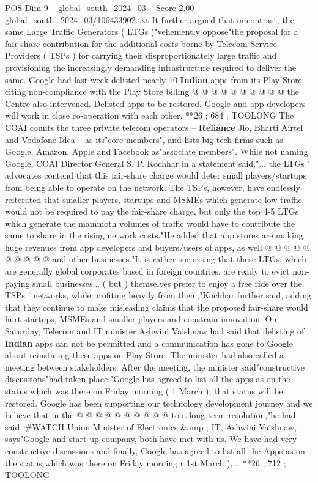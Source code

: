 \begin{textsample}{POS Dim 9 – global\_south\_2024\_03 – Score 2.00 – global\_south\_2024\_03/106433902.txt}
It further argued that in contrast, the same Large Traffic Generators ( LTGs )"vehemently oppose"the proposal for a fair-share contribution for the additional costs borne by Telecom Service Providers ( TSPs ) for carrying their disproportionately large traffic and provisioning the increasingly demanding infrastructure required to deliver the same.
Google had last week delisted nearly 10 \textbf{Indian} apps from its Play Store citing non-compliance with the Play Store billing @ @ @ @ @ @ @ @ @ @ the Centre also intervened.
Delisted apps to be restored.
Google and app developers will work in close co-operation with each other. **26 ; 684 ; TOOLONG The COAI counts the three private telecom operators -- \textbf{Reliance} Jio, Bharti Airtel and Vodafone Idea -- as its"core members", and lists big tech firms such as Google, Amazon, Apple and Facebook as"associate members".
While not naming Google, COAI Director General S.
P.
Kochhar in a statement said,"... the LTGs ' advocates contend that this fair-share charge would deter small players/startups from being able to operate on the network.
The TSPs, however, have endlessly reiterated that smaller players, startups and MSMEs which generate low traffic would not be required to pay the fair-share charge, but only the top 4-5 LTGs which generate the mammoth volumes of traffic would have to contribute the same to share in the rising network costs."He added that app stores are making huge revenues from app developers and buyers/users of apps, as well @ @ @ @ @ @ @ @ @ @ and other businesses."It is rather surprising that these LTGs, which are generally global corporates based in foreign countries, are ready to evict non-paying small businesses... ( but ) themselves prefer to enjoy a free ride over the TSPs ' networks, while profiting heavily from them,"Kochhar further said, adding that they continue to make misleading claims that the proposed fair-share would hurt startups, MSMEs and smaller players and constrain innovation.
On Saturday, Telecom and IT minister Ashwini Vaishnaw had said that delisting of \textbf{Indian} apps can not be permitted and a communication has gone to Google about reinstating these apps on Play Store.
The minister had also called a meeting between stakeholders.
After the meeting, the minister said"constructive discussions"had taken place."Google has agreed to list all the apps as on the status which was there on Friday morning ( 1 March ), that status will be restored.
Google has been supporting our technology development journey and we believe that in the @ @ @ @ @ @ @ @ @ @ to a long-term resolution,"he had said. \#WATCH Union Minister of Electronics \&amp ; IT, Ashwini Vaishnaw, says"Google and start-up company, both have met with us.
We have had very constructive discussions and finally, Google has agreed to list all the Apps as on the status which was there on Friday morning ( 1st March ),... **26 ; 712 ; TOOLONG

\end{textsample}
